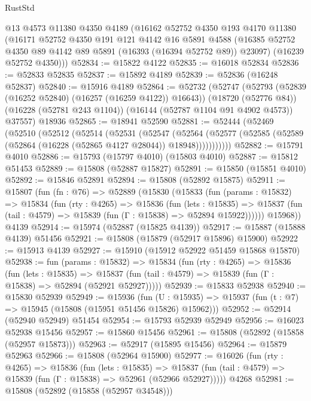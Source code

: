 \begin{lexlean}{RustStd}
\begin{coremodule}
    @13
    @4573
    @11380
    @4350
    @4189
    (@16162
      @52752
      @4350
      @193
      @4170
      @11380
      (@16171
        @52752
        @4350
        @191
        @121
        @4142
        @16
        @5891
        @4588
        (@16385 @52752 @4350 @89 @4142 @89 @5891 (@16393 (@16394 @52752 @89)) @23097)
        (@16239 @52752 @4350)))
@52834 := @15822 @4122
@52835 := @16018 @52834
@52836 := @52833 @52835
@52837 := @15892 @4189
@52839 := @52836 (@16248 @52837)
@52840 := @15916 @4189
@52864 := @52732
    (@52747
      (@52793 (@52839 (@16252 @52840) (@16257 (@16259 @4122)) @16643))
      (@18720 (@52776 @84))
      (@16228 (@52781 @243 @1104))
      (@16144 (@52787 @1104 @91 @4902 @4573))
      @37557)
    @18936
@52865 := @18941 @52590
@52881 := @52444
    (@52469
      (@52510
        (@52512
          (@52514
            (@52531
              (@52547
                (@52564
                  (@52577 (@52585 (@52589 (@52864 (@16228 (@52865 @4127 @28044)) @18948)))))))))))
@52882 := @15791 @4010
@52886 := @15793 (@15797 @4010) (@15803 @4010)
@52887 := @15812 @51453
@52889 := @15808 (@52887 @15827)
@52891 := @15850 (@15851 @4010)
@52892 := @15846 @52891
@52894 := @15808 (@52892 @15875)
@52911 := @15807
    (fun (fn : @76) =>
    @52889
      (@15830
        (@15833
          (fun (params : @15832) =>
          @15834
            (fun (rty : @4265) =>
            @15836
              (fun (lets : @15835) =>
              @15837 (fun (tail : @4579) => @15839 (fun (Γ : @15838) => @52894 @15922))))))
        @15968))
    @4139
@52914 := @15974 (@52887 (@15825 @4139))
@52917 := @15887 (@15888 @4139) @51456
@52921 := @15808 (@15879 (@52917 @15896) @15900)
@52922 := @15913 @4139
@52927 := @15910 (@15912 @52922 @51459 @15868 @15870)
@52938 := fun (params : @15832) =>
  @15834
    (fun (rty : @4265) =>
    @15836
      (fun (lets : @15835) =>
      @15837 (fun (tail : @4579) => @15839 (fun (Γ : @15838) => @52894 (@52921 @52927)))))
@52939 := @15833 @52938
@52940 := @15830 @52939
@52949 := @15936
    (fun (U : @15935) => @15937 (fun (t : @7) => @15945 (@15808 (@15951 @51456 @15826) @15962)))
@52952 := @52914 (@52940 @52949) @51454
@52954 := @15793 @52939 @52949
@52956 := @16023 @52938 @15456
@52957 := @15860 @15456
@52961 := @15808 (@52892 (@15858 (@52957 @15873)))
@52963 := @52917 (@15895 @15456)
@52964 := @15879 @52963
@52966 := @15808 (@52964 @15900)
@52977 := @16026
    (fun (rty : @4265) =>
    @15836
      (fun (lets : @15835) =>
      @15837 (fun (tail : @4579) => @15839 (fun (Γ : @15838) => @52961 (@52966 @52927)))))
    @4268
@52981 := @15808 (@52892 (@15858 (@52957 @34548)))

\end{coremodule}
\end{lexlean}
